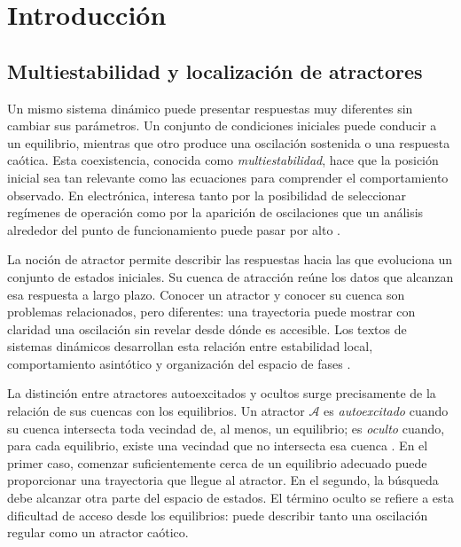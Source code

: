 \section{Introducción}
\label{sec:introduccion}

\subsection{Multiestabilidad y localización de atractores}

Un mismo sistema dinámico puede presentar respuestas muy diferentes sin
cambiar sus parámetros. Un conjunto de condiciones iniciales puede conducir
a un equilibrio, mientras que otro produce una oscilación sostenida o una
respuesta caótica. Esta coexistencia, conocida como \emph{multiestabilidad},
hace que la posición inicial sea tan relevante como las ecuaciones para
comprender el comportamiento observado. En electrónica, interesa tanto por
la posibilidad de seleccionar regímenes de operación como por la aparición
de oscilaciones que un análisis alrededor del punto de funcionamiento puede
pasar por alto \cite{DudkowskiEtAl2016,WangKuznetsovChen2021Multistability}.

La noción de atractor permite describir las respuestas hacia las que evoluciona
un conjunto de estados iniciales. Su cuenca de atracción reúne los datos que
alcanzan esa respuesta a largo plazo. Conocer un atractor y conocer su cuenca
son problemas relacionados, pero diferentes: una trayectoria puede mostrar
con claridad una oscilación sin revelar desde dónde es accesible. Los textos
de sistemas dinámicos desarrollan esta relación entre estabilidad local,
comportamiento asintótico y organización del espacio de fases
\cite{HirschSmaleDevaney2013,Strogatz2015Nonlinear}.

La distinción entre atractores autoexcitados y ocultos surge precisamente de
la relación de sus cuencas con los equilibrios. Un atractor \(\mathcal A\) es
\emph{autoexcitado} cuando su cuenca intersecta toda vecindad de, al menos,
un equilibrio; es \emph{oculto} cuando, para cada equilibrio, existe una
vecindad que no intersecta esa cuenca
\cite{LeonovKuznetsov2013,DudkowskiEtAl2016}. En el primer caso, comenzar
suficientemente cerca de un equilibrio adecuado puede proporcionar una
trayectoria que llegue al atractor. En el segundo, la búsqueda debe alcanzar
otra parte del espacio de estados. El término oculto se refiere a esta
dificultad de acceso desde los equilibrios: puede describir tanto una
oscilación regular como un atractor caótico.

